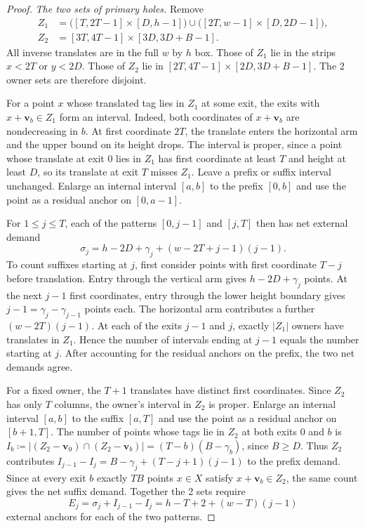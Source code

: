 \documentclass[10pt]{article}
\numberwithin{equation}{section}
\theoremstyle{definition}
\begin{document}
\begin{proof}
\emph{The two sets of primary holes.}
Remove
\[
\begin{aligned}
 Z_1&=\bigl([T,2T-1]\times[D,h-1]\bigr)\cup\bigl([2T,w-1]\times[D,2D-1]\bigr),\\
 Z_2&=[3T,4T-1]\times[3D,3D+B-1].
\end{aligned}
\]
All inverse translates are in the full $w$ by $h$ box. Those of $Z_1$ lie in the strips $x<2T$ or $y<2D$. Those of $Z_2$ lie in $[2T,4T-1]\times[2D,3D+B-1]$. The 2 owner sets are therefore disjoint.

For a point $x$ whose translated tag lies in $Z_1$ at some exit, the exits with $x+\mathbf v_b\in Z_1$ form an interval. Indeed, both coordinates of $x+\mathbf v_b$ are nondecreasing in $b$. At first coordinate $2T$, the translate enters the horizontal arm and the upper bound on its height drops. The interval is proper, since a point whose translate at exit 0 lies in $Z_1$ has first coordinate at least $T$ and height at least $D$, so its translate at exit $T$ misses $Z_1$. Leave a prefix or suffix interval unchanged. Enlarge an internal interval $[a,b]$ to the prefix $[0,b]$ and use the point as a residual anchor on $[0,a-1]$.

For $1\le j\le T$, each of the patterns $[0,j-1]$ and $[j,T]$ then has net external demand
\[
 \sigma_j=h-2D+\gamma_j+(w-2T+j-1)(j-1).
\]
To count suffixes starting at $j$, first consider points with first coordinate $T-j$ before translation. Entry through the vertical arm gives $h-2D+\gamma_j$ points. At the next $j-1$ first coordinates, entry through the lower height boundary gives $j-1=\gamma_j-\gamma_{j-1}$ points each. The horizontal arm contributes a further $(w-2T)(j-1)$. At each of the exits $j-1$ and $j$, exactly $|Z_1|$ owners have translates in $Z_1$. Hence the number of intervals ending at $j-1$ equals the number starting at $j$. After accounting for the residual anchors on the prefix, the two net demands agree.

For a fixed owner, the $T+1$ translates have distinct first coordinates. Since $Z_2$ has only $T$ columns, the owner's interval in $Z_2$ is proper. Enlarge an internal interval $[a,b]$ to the suffix $[a,T]$ and use the point as a residual anchor on $[b+1,T]$. The number of points whose tags lie in $Z_2$ at both exits $0$ and $b$ is $I_b\coloneqq |(Z_2-\mathbf v_0)\cap(Z_2-\mathbf v_b)|=(T-b)(B-\gamma_b)$, since $B\ge D$. Thus $Z_2$ contributes $I_{j-1}-I_j=B-\gamma_j+(T-j+1)(j-1)$ to the prefix demand. Since at every exit $b$ exactly $TB$ points $x\in X$ satisfy $x+\mathbf v_b\in Z_2$, the same count gives the net suffix demand. Together the 2 sets require
\[
 E_j=\sigma_j+I_{j-1}-I_j=h-T+2+(w-T)(j-1)
\]
external anchors for each of the two patterns.


\end{proof}
\end{document}
